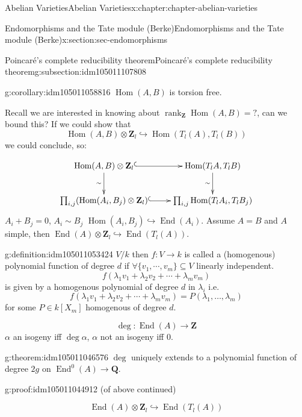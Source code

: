 \documentclass[oneside,10pt,]{book}
\numberwithin{equation}{section}
\newcommand{\lb}{[}
\newcommand{\rb}{]}
\newcommand{\ZZ}{\mathbf{Z}}
\newcommand{\QQ}{\mathbf{Q}}
\DeclareMathOperator{\End}{End}
\DeclareMathOperator{\Hom}{Hom}
\DeclareMathOperator{\rank}{rank}
\begin{document}
\begin{chapterptx}{Abelian Varieties}{}{Abelian Varieties}{}{}{x:chapter:chapter-abelian-varieties}
\begin{sectionptx}{Endomorphisms and the Tate module (Berke)}{}{Endomorphisms and the Tate module (Berke)}{}{}{x:section:sec-endomorphisms}
\begin{subsectionptx}{Poincaré's complete reducibility theorem}{}{Poincaré's complete reducibility theorem}{}{}{g:subsection:idm105011107808}
\begin{corollary}{}{}{g:corollary:idm105011058816}
\(\Hom(A,B)\) is torsion free.%
\end{corollary}
Recall we are interested in knowing about \(\rank_\ZZ\Hom(A,B) = ?\), can we bound this? If we could show that%
\begin{equation*}
\Hom(A,B) \otimes \ZZ_l \hookrightarrow \Hom(T_l(A),T_l(B))
\end{equation*}
we could conclude, so:%
\par
%
\begin{equation*}
\xymatrix{
\Hom(A,B)\otimes \ZZ_l \ar[d]_{\sim} \ar@{^(->}[r]     & \Hom(T_lA,T_lB)\ar[d]_{\sim} \\
\prod_{i,j} (\Hom(A_i, B_j) \otimes \ZZ_l) \ar@{^(->}[r] & \prod_{i,j}\Hom(T_lA_i, T_l B_j)
}
\end{equation*}
\(A_i + B_j = 0\), \(A_i\sim B_j\) \(\Hom(A_i, B_j) \hookrightarrow \End(A_i)\). Assume \(A= B\) and \(A\) simple, then \(\End(A) \otimes \ZZ_l \hookrightarrow \End(T_l(A))\).%
\begin{definition}{}{g:definition:idm105011053424}%
\(V/k\) then \(f\colon V \to k\) is called a (homogenous) polynomial function of degree \(d\) if \(\forall \{v_1,\cdots, v_m\}\subseteq V\) linearly independent.%
\begin{equation*}
f(\lambda_1 v_1 + \lambda_2 v_2 +\cdots + \lambda_m v_m)
\end{equation*}
is given by a homogenous polynomial of degree \(d\) in \(\lambda_i\) i.e.%
\begin{equation*}
f(\lambda_1 v_1 + \lambda_2 v_2 +\cdots + \lambda_m v_m) = P(\lambda_1,\ldots, \lambda_m)
\end{equation*}
for some \(P\in k\lb X_m\rb\) homogenous of degree \(d\).%
\end{definition}
%
\begin{equation*}
\deg\colon \End(A) \to \ZZ
\end{equation*}
\(\alpha\) an isogeny iff \(\deg \alpha\), \(\alpha\) not an isogeny iff \(0\).%
\begin{theorem}{}{}{g:theorem:idm105011046576}%
\(\deg\) uniquely extends to a polynomial function of degree \(2g\) on \(\End^0(A) \to \QQ\).%
\end{theorem}
\begin{proofptx}{}{g:proof:idm105011044912}
(of above continued)%
\par
%
\begin{equation*}
\End(A) \otimes \ZZ_l \hookrightarrow\End(T_l(A))
\end{equation*}

\end{proofptx}
\end{subsectionptx}
\end{sectionptx}
\end{chapterptx}
\end{document}
